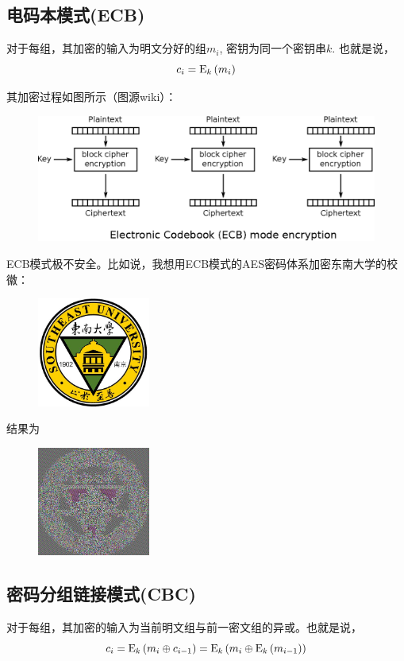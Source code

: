 \subsection{电码本模式(ECB)}
对于每组，其加密的输入为明文分好的组$m_i$, 密钥为同一个密钥串$k$. 也就是说，
\begin{equation}
c_i={\mathrm{E}_{k}\left({m_i}\right)}
\end{equation}

其加密过程如图所示（图源wiki）：
\begin{figure}[H]
\centering
\includegraphics[scale=1]{chapters/chapter_4/ECB.eps}
\end{figure}

ECB模式极不安全。比如说，我想用ECB模式的AES密码体系加密东南大学的校徽：
\begin{figure}[H]
\centering
\includegraphics[width=10em]{chapters/chapter_4/ECB_origin.jpg}
\end{figure}

结果为
\begin{figure}[H]
\centering
\includegraphics[width=10em]{chapters/chapter_4/ECB_result.jpg}
\end{figure}
\subsection{密码分组链接模式(CBC)}
对于每组，其加密的输入为当前明文组与前一密文组的异或。也就是说，
\begin{equation}
c_i={\mathrm{E}_{k}\left({m_i\oplus c_{i-1}}\right)}={\mathrm{E}_{k}\left({m_i\oplus {\mathrm{E}_{k}\left({m_{i-1}}\right)}}\right)}
\end{equation}

